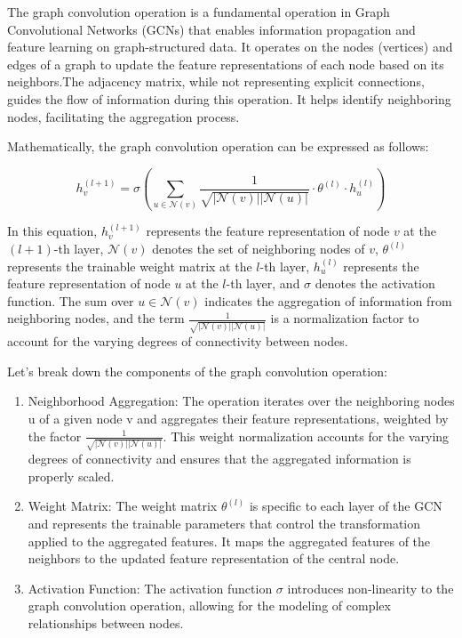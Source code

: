 The graph convolution operation is a fundamental operation in Graph Convolutional Networks (GCNs) that enables information propagation and feature learning on graph-structured data. It operates on the nodes (vertices) and edges of a graph to update the feature representations of each node based on its neighbors.The adjacency matrix, while not representing explicit connections, guides the flow of information during this operation. It helps identify neighboring nodes, facilitating the aggregation process.


Mathematically, the graph convolution operation can be expressed as follows:

\begin{equation}
h_v^{(l+1)} = \sigma\left(\sum_{u \in \mathcal{N}(v)} \frac{1}{\sqrt{|\mathcal{N}(v)||\mathcal{N}(u)|}} \cdot \theta^{(l)} \cdot h_u^{(l)}\right)
\end{equation}

In this equation, $h_v^{(l+1)}$ represents the feature representation of node $v$ at the $(l+1)$-th layer, $\mathcal{N}(v)$ denotes the set of neighboring nodes of $v$, $\theta^{(l)}$ represents the trainable weight matrix at the $l$-th layer, $h_u^{(l)}$ represents the feature representation of node $u$ at the $l$-th layer, and $\sigma$ denotes the activation function. The sum over $u \in \mathcal{N}(v)$ indicates the aggregation of information from neighboring nodes, and the term $\frac{1}{\sqrt{|\mathcal{N}(v)||\mathcal{N}(u)|}}$ is a normalization factor to account for the varying degrees of connectivity between nodes.

Let's break down the components of the graph convolution operation:
\begin{enumerate}
\item Neighborhood Aggregation: The operation iterates over the neighboring nodes u of a given node v and aggregates their feature representations, weighted by the factor $\frac{1}{\sqrt{|\mathcal{N}(v)||\mathcal{N}(u)|}}$. This weight normalization accounts for the varying degrees of connectivity and ensures that the aggregated information is properly scaled.

\item Weight Matrix: The weight matrix $\theta^{(l)}$ is specific to each layer of the GCN and represents the trainable parameters that control the transformation applied to the aggregated features. It maps the aggregated features of the neighbors to the updated feature representation of the central node.

\item Activation Function: The activation function $\sigma$ introduces non-linearity to the graph convolution operation, allowing for the modeling of complex relationships between nodes.

\end{enumerate}

